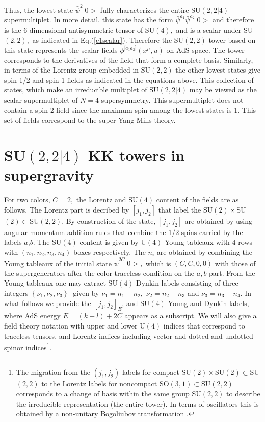\documentclass[a4paper,aps,preprint,nofootinbib]{revtex4}
\begin{document}
Thus, the lowest state $\bar{\psi}^{2}|0>$ fully characterizes the entire SU$%
\left( 2,2|4\right) $ supermultiplet. In more detail, this state has the
form $\bar{\psi}^{a_{1}}\bar{\psi}^{a_{2}}|0>$ and therefore is the 6
dimensional antisymmetric tensor of SU$\left( 4\right) ,$ and is a scalar
under SU$\left( 2,2\right) ,$ as indicated in Eq.(\ref{c1scalar}). Therefore
the SU$\left( 2,2\right)$ tower based on this state represents the scalar
fields $\phi^{\lbrack a_{1}a_{2}]}\left( x^{\mu},u\right) $ on AdS space.
The tower corresponds to the derivatives of the field that form a complete
basis$.$ Similarly, in terms of the Lorentz group embedded in SU$\left(
2,2\right) $ the other lowest states give spin 1/2 and spin 1 fields as
indicated in the equations above. This collection of states, which make an
irreducible multiplet of SU$\left( 2,2|4\right) $ may be viewed as the
scalar supermultiplet of $N=4$ supersymmetry. This supermultiplet does not
contain a spin 2 field since the maximum spin among the lowest states is 1.
This set of fields correspond to the super Yang-Mills theory.

\section{SU$\left( 2,2|4\right) $ KK towers in supergravity}

For two colors, $C=2,$ the Lorentz and SU$\left( 4\right) $ content of the
fields are as follows. The Lorentz part is decribed by $\left[ j_{1},j_{2}%
\right] $ that label the SU$\left( 2\right) \times$SU$\left( 2\right)
\subset $SU$\left( 2,2\right) .$ By construction of the state, $\left[
j_{1},j_{2}\right] $ are obtained by using angular momentum addition rules
that combine the 1/2 spins carried by the labels $\bar{a}$,$\bar{b}.$ The SU$%
\left( 4\right) $ content is given by U$\left( 4\right) $ Young tableaux
with 4 rows with $\left( n_{1},n_{2},n_{3},n_{4}\right) $ boxes
respectively. The $n_{i}$ are obtained by combining the Young tableaux of
the initial state $\bar{\psi}^{2C}|0>,$ which is $\left( C,C,0,0\right) $
with those of the supergenerators after the color traceless condition on the
$a,b$ part. From the Young tableaux one may extract SU$\left( 4\right) $
Dynkin labels consisting of three integers $\left\{
\nu_{1},\nu_{2},\nu_{3}\right\} \ $ given by $\nu_{1}=n_{1}-n_{2},$ $%
\nu_{2}=n_{2}-n_{3}$ and $\nu_{3}=n_{3}-n_{4}.$ In what follows we provide
the $\left[ j_{1},j_{2}\right] _{E}$, and SU$\left( 4\right) $ Young and
Dynkin labels, where AdS energy $E=\left( k+l\right) +2C$ appears as a
subscript. We will also give a field theory notation with upper and lower U$%
\left( 4\right) $ indices that correspond to traceless tensors, and Lorentz
indices including vector and dotted and undotted spinor indices\footnote{%
The migration from the $\left( j_{1},j_{2}\right) $ labels for compact SU$%
\left( 2\right) \times $SU$\left( 2\right) \subset$SU$\left( 2,2\right) $ to
the Lorentz labels for noncompact SO$\left( 3,1\right) \subset$SU$\left(
2,2\right) $ corresponds to a change of basis within the same group SU$%
\left( 2,2\right) $ to describe the irreducible representation (the entire
tower)$.$ In terms of oscillators this is obtained by a non-unitary
Bogoliubov transformation \cite{G}.}.
\end{document}
